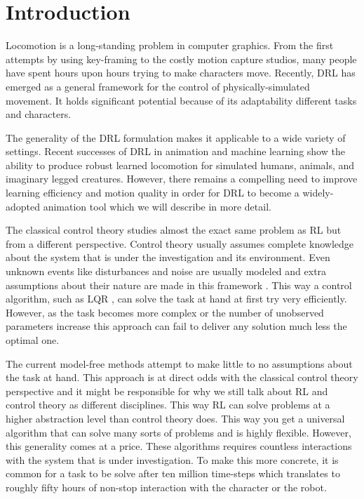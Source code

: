 
\chapter{Introduction}
\label{ch:Introduction}

Locomotion is a long-standing problem in computer graphics.
From the first attempts by using key-framing  to the costly motion capture studios, many people have spent hours upon hours trying to make characters move. Recently, \ac{DRL} has emerged as a general framework for the control of physically-simulated movement. It holds significant potential because of its adaptability different tasks and characters.

The generality of the \ac{DRL} formulation makes it applicable to a wide variety of settings. Recent successes of \ac{DRL} in animation and machine learning show the ability to produce robust learned locomotion for simulated humans, animals, and imaginary legged creatures. However, there remains a compelling need to improve learning efficiency and motion quality in order for \ac{DRL} to become a widely-adopted animation tool which we will describe in more detail.




The classical control theory studies almost the exact same problem as \ac{RL} but from a different perspective. Control theory usually assumes complete knowledge about the system that is under the investigation and its environment. Even unknown events like disturbances and noise are usually modeled and extra assumptions about their nature are made in this framework . This way a control algorithm, such as LQR , can solve the task at hand at first try very efficiently. However, as the task becomes more complex or the number of unobserved parameters increase this approach can fail to deliver any solution much less the optimal one.

The current model-free methods attempt to make little to no assumptions about the task at hand. This approach is at direct odds with the classical control theory perspective and it might be responsible for why we still talk about \ac{RL} and control theory as different disciplines. This way \ac{RL} can solve problems at a higher abstraction level than control theory does. This way you get a universal algorithm that can solve many sorts of problems and is highly flexible. However, this generality comes at a price. These algorithms requires countless interactions with the system that is under investigation. To make this more concrete, it is common for a task to be solve after ten million time-steps which translates to roughly fifty hours of non-stop interaction with the character or the robot.

